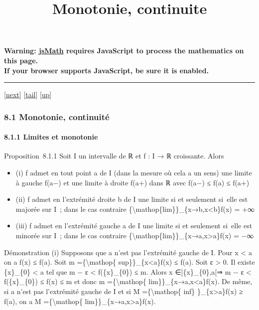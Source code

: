 \documentclass[]{article}
\title{Monotonie, continuite}
\author{}
\date{}
\begin{document}
\maketitle

\textbf{Warning: \href{http://www.math.union.edu/locate/jsMath}{jsMath}
requires JavaScript to process the mathematics on this page.\\ If your
browser supports JavaScript, be sure it is enabled.}

\begin{center}\rule{3in}{0.4pt}\end{center}

{[}\href{coursse45.html}{next}{]}
{[}\hyperref[tailcoursse44.html]{tail}{]}
{[}\href{coursch9.html\#coursse44.html}{up}{]}

\subsubsection{8.1 Monotonie, continuité}

\paragraph{8.1.1 Limites et monotonie}

Proposition~8.1.1 Soit I un intervalle de ℝ et f : I → ℝ croissante.
Alors

\begin{itemize}
\itemsep1pt\parskip0pt
\item
  (i) f admet en tout point a de I (dans la mesure où cela a un sens)
  une limite à gauche f(a−) et une limite à droite f(a+) dans ℝ avec
  f(a−) ≤ f(a) ≤ f(a+)
\item
  (ii) f admet en l'extrémité droite b de I une limite si et seulement
  si~elle est majorée sur I~; dans le cas contraire
  \{\textbackslash{}mathop\{lim\}\}\_\{x→b,x\textless{}b\}f(x) = +∞
\item
  (iii) f admet en l'extrémité gauche a de I une limite si et seulement
  si~elle est minorée sur I~; dans le cas contraire
  \{\textbackslash{}mathop\{lim\}\}\_\{x→a,x\textgreater{}a\}f(x) = −∞
\end{itemize}

Démonstration (i) Supposons que a n'est pas l'extrémité gauche de I.
Pour x \textless{} a on a f(x) ≤ f(a). Soit m
=\{\textbackslash{}mathop\{ sup\}\}\_\{x\textless{}a\}f(x) ≤ f(a). Soit
ε \textgreater{} 0. Il existe \{x\}\_\{0\} \textless{} a tel que m − ε
\textless{} f(\{x\}\_\{0\}) ≤ m. Alors x ∈{]}\{x\}\_\{0\},a{[}⇒ m − ε
\textless{} f(\{x\}\_\{0\}) ≤ f(x) ≤ m et donc m
=\{\textbackslash{}mathop\{ lim\}\}\_\{x→a,x\textless{}a\}f(x). De même,
si a n'est pas l'extrémité gauche de I et si M
=\{\textbackslash{}mathop\{ inf\} \}\_\{x\textgreater{}a\}f(x) ≥ f(a),
on a M =\{\textbackslash{}mathop\{
lim\}\}\_\{x→a,x\textgreater{}a\}f(x).
\end{document}
